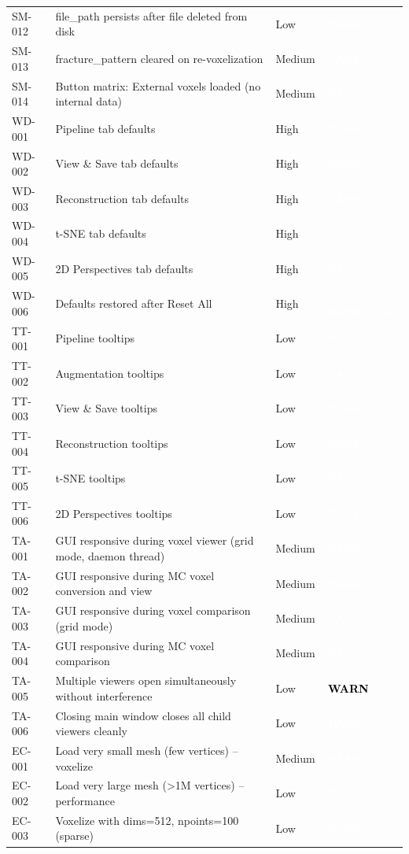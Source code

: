 \documentclass[12pt,a4paper]{article}
\newcommand{\statuspass}{\colorbox{statusgreen}{\textcolor{white}{\textbf{\,PASS\,}}}}
\newcommand{\statuswarn}{\colorbox{statusyellow}{\textcolor{black}{\textbf{\,WARN\,}}}}
\newcommand{\statusresolved}{\colorbox{statusorange}{\textcolor{white}{\textbf{\,RESOLVED\,}}}}
\begin{document}
{\begin{longtable}{p{1.7cm}p{7.7cm}p{1.3cm}p{2cm}}
SM-012 & file\_path persists after file deleted from disk & Low & \statuspass \\
SM-013 & fracture\_pattern cleared on re-voxelization & Medium & \statuspass \\
SM-014 & Button matrix: External voxels loaded (no internal data) & Medium & \statuspass \\
WD-001 & Pipeline tab defaults & High & \statuspass \\
WD-002 & View \& Save tab defaults & High & \statuspass \\
WD-003 & Reconstruction tab defaults & High & \statuspass \\
WD-004 & t-SNE tab defaults & High & \statuspass \\
WD-005 & 2D Perspectives tab defaults & High & \statuspass \\
WD-006 & Defaults restored after Reset All & High & \statusresolved \\
TT-001 & Pipeline tooltips & Low & \statuspass \\
TT-002 & Augmentation tooltips & Low & \statuspass \\
TT-003 & View \& Save tooltips & Low & \statuspass \\
TT-004 & Reconstruction tooltips & Low & \statuspass \\
TT-005 & t-SNE tooltips & Low & \statuspass \\
TT-006 & 2D Perspectives tooltips & Low & \statuspass \\
TA-001 & GUI responsive during voxel viewer (grid mode, daemon thread) & Medium & \statuspass \\
TA-002 & GUI responsive during MC voxel conversion and view & Medium & \statuspass \\
TA-003 & GUI responsive during voxel comparison (grid mode) & Medium & \statuspass \\
TA-004 & GUI responsive during MC voxel comparison & Medium & \statuspass \\
TA-005 & Multiple viewers open simultaneously without interference & Low & \statuswarn \\
TA-006 & Closing main window closes all child viewers cleanly & Low & \statuspass \\
EC-001 & Load very small mesh (few vertices) -- voxelize & Medium & \statuspass \\
EC-002 & Load very large mesh (>1M vertices) -- performance & Low & \statuspass \\
EC-003 & Voxelize with dims=512, npoints=100 (sparse) & Low & \statuspass \\

\end{longtable}}
\end{document}
